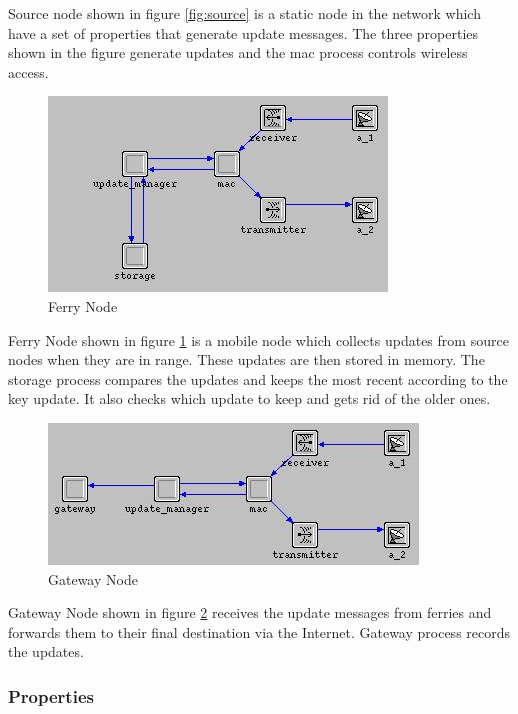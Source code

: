 Source node shown in figure \ref{fig:source} is a static node in the network which have a set of properties that generate update messages. The three properties shown in the figure generate updates and the mac process controls wireless access. 	



\begin{figure}[h]
    \centering
    \includegraphics[width=.5\textwidth]{images/ferry}
    \caption{Ferry Node}
    \label{fig:Ferry}
\end{figure}

Ferry Node shown in figure \ref{fig:Ferry} is a mobile node which collects updates from source nodes when they are in range. These updates are then stored in memory. The storage process compares the updates and keeps the most recent according to the key update. It also checks which update to keep and gets rid of the older ones.

\begin{figure}[h]
    \centering
    \includegraphics[width=.5\textwidth]{images/gateway}
    \caption{Gateway Node}
    \label{fig:Gateway}
\end{figure}

Gateway Node shown in figure \ref{fig:Gateway} receives the update messages from ferries and forwards them to their final destination via the Internet. Gateway process records the updates.



\subsubsection{Properties}

